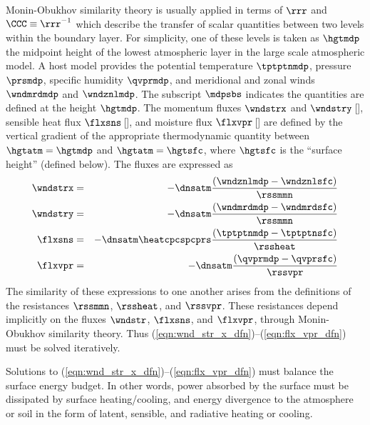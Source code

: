 \documentclass[12pt,twoside]{book}
\begin{document}
Monin-Obukhov similarity theory is usually applied in terms of
 $\rrr$ and  
$\CCC \equiv \rrr^{-1}$ which describe the transfer of scalar
quantities between two levels within the boundary layer.
For simplicity, one of these levels is taken as $\hgtmdp$ the midpoint
height of the lowest atmospheric layer in the large scale atmospheric
model.
A host model provides the potential temperature $\tptptnmdp$, pressure 
$\prsmdp$, specific humidity $\qvprmdp$, and meridional and zonal
winds $\wndmrdmdp$ and $\wndznlmdp$.
The subscript $\mdpsbs$ indicates the quantities are defined at the
height $\hgtmdp$. 
The momentum fluxes $\wndstrx$ and $\wndstry$\,[\kgxmsS], sensible heat
flux $\flxsns$\,[\wxmS], and moisture flux $\flxvpr$\,[\kgxmSs] are
defined by the vertical gradient of the appropriate thermodynamic
quantity between $\hgtatm = \hgtmdp$ and $\hgtatm = \hgtsfc$, where
$\hgtsfc$ is the ``surface height'' (defined below).
The fluxes are expressed as
\begin{eqnarray}
\label{eqn:wnd_str_x_dfn}
\wndstrx & = & -\dnsatm \frac{( \wndznlmdp - \wndznlsfc )}{\rssmmn} \\
\label{eqn:wnd_str_y_dfn}
\wndstry & = & -\dnsatm \frac{( \wndmrdmdp - \wndmrdsfc )}{\rssmmn} \\
\label{eqn:flx_sns_dfn}
\flxsns & = & -\dnsatm \heatcpcspcprs \frac{( \tptptnmdp - \tptptnsfc )
}{ \rssheat} \\
\label{eqn:flx_vpr_dfn}
\flxvpr & = & -\dnsatm \frac{( \qvprmdp - \qvprsfc )}{\rssvpr} 
\end{eqnarray}
The similarity of these expressions to one another arises from the
definitions of the resistances $\rssmmn$, $\rssheat$, and $\rssvpr$.  
These resistances depend implicitly on the fluxes $\wndstr$,
$\flxsns$, and $\flxvpr$, through Monin-Obukhov similarity theory.
Thus (\ref{eqn:wnd_str_x_dfn})--(\ref{eqn:flx_vpr_dfn}) must be solved   
iteratively.

Solutions to (\ref{eqn:wnd_str_x_dfn})--(\ref{eqn:flx_vpr_dfn}) must
balance the surface energy budget.
In other words, power absorbed by the surface must be dissipated by
surface heating/cooling, and energy divergence to the atmosphere or
soil in the form of latent, sensible, and radiative heating or
cooling.
\end{document}
